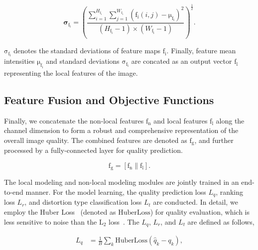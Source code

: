 \begin{equation}
	\boldsymbol{\sigma}_{\boldsymbol{\mathrm{f_{i}}}}=\left(\frac{\sum_{i=1}^{H_{\boldsymbol{\mathrm{f_{i}}}}} \sum_{j=1}^{W_{\boldsymbol{\mathrm{f_{i}}}}} \left(\boldsymbol{\mathrm{f_{i}}}\left(i, j\right) - \boldsymbol{\mathrm\mu}_{\boldsymbol{\mathrm{f_{i}}}}\right)^{2}}{(H_{\boldsymbol{\mathrm{f_{i}}}} - 1) \times (W_{\boldsymbol{\mathrm{f_{i}}}} - 1)}\right)^{\frac{1}{2}}.
\end{equation}

\indent$\boldsymbol{\mathrm\sigma}_{\boldsymbol{\mathrm{f_{i}}}}$ denotes the standard deviations of feature maps $\boldsymbol{\mathrm{f_{i}}}$. Finally, feature mean intensities $\boldsymbol{\mathrm\mu}_{\boldsymbol{\mathrm{f_{i}}}}$ and standard deviations $\boldsymbol{\mathrm\sigma}_{\boldsymbol{\mathrm{f_{i}}}}$ are concated as an output vector $\boldsymbol{\mathrm{f_{l}}}$ representing the local features of the image.

\subsection{Feature Fusion and Objective Functions}
Finally, we concatenate the non-local features $\boldsymbol{\mathrm{f_{n}}}$ and local features $\boldsymbol{\mathrm{f_{l}}}$ along the channel dimension to form a robust and comprehensive representation of the overall image quality. The combined features are denoted as $\boldsymbol{\mathrm{f_{g}}}$, and further processed by a fully-connected layer for quality prediction.

\begin{equation}
	\boldsymbol{\mathrm{f_{g}}}=[\boldsymbol{\mathrm{f_{n}}}\mathop{\|}\boldsymbol{\mathrm{f_{l}}}].
\end{equation}

\indent The local modeling and non-local modeling modules are jointly trained in an end-to-end manner. For the model learning, the quality prediction loss ${L}_{q}$, ranking loss ${L}_{r}$, and distortion type classification loss ${L}_{t}$ are conducted. In detail, we employ the Huber Loss~\citep{Huberloss} (denoted as ${\mathrm{HuberLoss}}$) for quality evaluation, which is less sensitive to noise than the ${\mathrm L}_{2}$ loss~\citep{wu2020end}. The ${L}_{q}$, ${L}_{r}$, and ${L}_{t}$ are defined as follows,

\begin{align}
	\label{quality}
	L_{q} & =\frac{1}{B} \sum_k {\mathrm{HuberLoss}}(\hat{q}_k - q_k),
\end{align}

